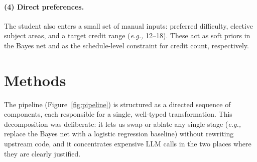 \documentclass[10pt,letterpaper]{article}
\newcommand{\eg}{\emph{e.g.,}}
\begin{document}
\paragraph{(4) Direct preferences.} The student also enters a small set of
manual inputs: preferred difficulty, elective subject areas, and a target
credit range (\eg{} 12--18). These act as soft priors in the Bayes net and
as the schedule-level constraint for credit count, respectively.

\section{Methods}

The pipeline (Figure~\ref{fig:pipeline}) is structured as a directed
sequence of components, each responsible for a single, well-typed
transformation. This decomposition was deliberate: it lets us swap or
ablate any single stage (\eg{} replace the Bayes net with a logistic
regression baseline) without rewriting upstream code, and it concentrates
expensive LLM calls in the two places where they are clearly justified.
\end{document}
